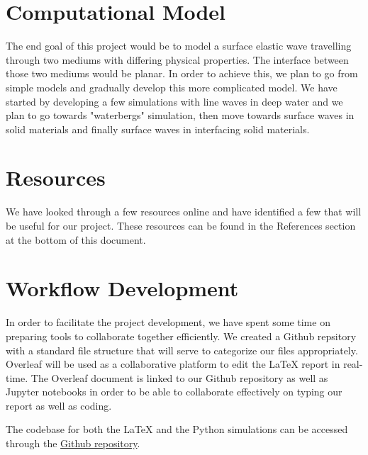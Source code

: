 \section{Computational Model}
The end goal of this project would be to model a surface elastic wave travelling through two mediums with differing physical properties. The interface between those two mediums would be planar. In order to achieve this, we plan to go from simple models and gradually develop this more complicated model. We have started by developing a few simulations with line waves in deep water and we plan to go towards "waterbergs" simulation, then move towards surface waves in solid materials and finally surface waves in interfacing solid materials.

\section{Resources}
We have looked through a few resources online and have identified a few that will be useful for our project. These resources can be found in the References section at the bottom of this document.

\section{Workflow Development}
In order to facilitate the project development, we have spent some time on preparing tools to collaborate together efficiently. We created a Github repsitory with a standard file structure that will serve to categorize our files appropriately. Overleaf will be used as a collaborative platform to edit the \LaTeX{} report in real-time. The Overleaf document is linked to our Github repository as well as Jupyter notebooks in order to be able to collaborate effectively on typing our report as well as coding.

The codebase for both the \LaTeX{} and the Python simulations can be accessed through the \href{https://github.com/dreneuw/AMATH361-Project}{Github repository}.
